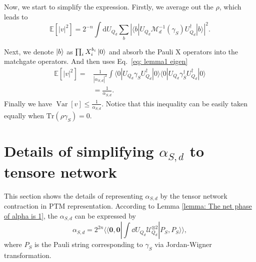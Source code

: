 \documentclass[showpacs,twocolumn,aps,prx,long bibliography,superscriptaddress,notitlepage]{revtex4-1}
\newcommand{\supket}[1]{|#1 \rangle\rangle}
\newcommand{\supbra}[1]{\langle\langle #1 |}
\newcommand{\tra}[1]{\text{Tr}\left( #1 \right)}
\newcommand{\Var}{\mathop{\mathrm{Var}}}
\begin{document}
Now, we start to simplify the expression.
Firstly, we average out the $\rho$, which leads to
\begin{equation}
    \mathbb{E}[|v|^2] = 2^{-n} \int \mathrm{d}U_{Q_d} \sum_b \left|\langle b|U_{Q_d} \mathcal{M}_d^{-1}(\gamma_S) U_{Q_d}^\dagger|b \rangle\right|^2.
\end{equation}

Next, we denote $\ket{b}$ as $\prod_i X_i^{b_i}\ket{0}$ and absorb the Pauli X operators into the matchgate operators.                                          
And then uses Eq.~\eqref{eq: lemma1 eigen}
\begin{align}
    \mathbb{E}[|v|^2] =& \frac{1}{|\alpha_{S,d}|^2} \int \langle 0|U_{Q_d} \gamma_S U_{Q_d}^\dagger|0 \rangle \langle 0|U_{Q_d} \gamma_S^\dagger U_{Q_d}^\dagger|0 \rangle \\
 &=\frac{1}{\alpha_{S,d}}.
\end{align}
Finally we have $\Var[v] \leq \frac{1}{\alpha_{S,d}}$. 
Notice that this inequality can be easily taken equally when $\tra{\rho \gamma_S} = 0$.


\section{Details of simplifying $\alpha_{S,d}$ to tensore network}
\label{appendix 3}
 This section shows the details of representing $\alpha_{S,d}$ by the tensor network contraction in PTM representation. According to Lemma \ref{lemma: The net phase of alpha is 1}, the $\alpha_{S,d}$ can be expressed by 
 \begin{equation}
     \alpha_{S,d} = 2^{2n}  \supbra{\bm 0,\bm 0}  \int\dd U_{Q_d} \mathcal{U}_{Q_d}^{\otimes 2} \supket{P_S,P_S}, 
 \end{equation}
where $P_S$ is the Pauli string corresponding to $\gamma_S$ via Jordan-Wigner transformation. 
\end{document}
